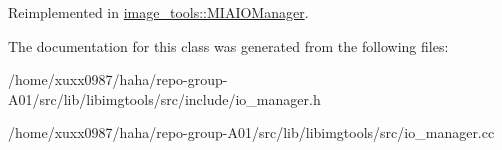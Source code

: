 Reimplemented in \hyperlink{classimage__tools_1_1MIAIOManager_a209180ddcfe3bf43d8fd7c6635391ea4}{image\+\_\+tools\+::\+M\+I\+A\+I\+O\+Manager}.



The documentation for this class was generated from the following files\+:\begin{DoxyCompactItemize}
\item 
/home/xuxx0987/haha/repo-\/group-\/\+A01/src/lib/libimgtools/src/include/io\+\_\+manager.\+h\item 
/home/xuxx0987/haha/repo-\/group-\/\+A01/src/lib/libimgtools/src/io\+\_\+manager.\+cc\end{DoxyCompactItemize}
